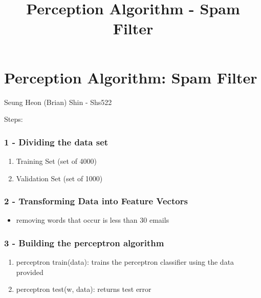 \documentclass[11pt]{article}
\title{Perception Algorithm - Spam Filter}
\providecommand{\tightlist}{%
      \setlength{\itemsep}{0pt}\setlength{\parskip}{0pt}}
\begin{document}
    
    
    \maketitle
    
    

    
    \section{Perception Algorithm: Spam
Filter}\label{perception-algorithm-spam-filter}

Seung Heon (Brian) Shin - Shs522

    Steps:

\subsubsection{1 - Dividing the data set }\label{dividing-the-data-set}

\begin{enumerate}
\def\labelenumi{\alph{enumi})}
\item
  Training Set (set of 4000)
\item
  Validation Set (set of 1000)
\end{enumerate}

\subsubsection{2 - Transforming Data into Feature
Vectors}\label{transforming-data-into-feature-vectors}

\begin{itemize}
\tightlist
\item
  removing words that occur is less than 30 emails
\end{itemize}

\subsubsection{3 - Building the perceptron
algorithm}\label{building-the-perceptron-algorithm}

\begin{enumerate}
\def\labelenumi{\alph{enumi})}
\item
  perceptron train(data): trains the perceptron classifier using the
  data provided
\item
  perceptron test(w, data): returns test error
\end{enumerate}
\end{document}
